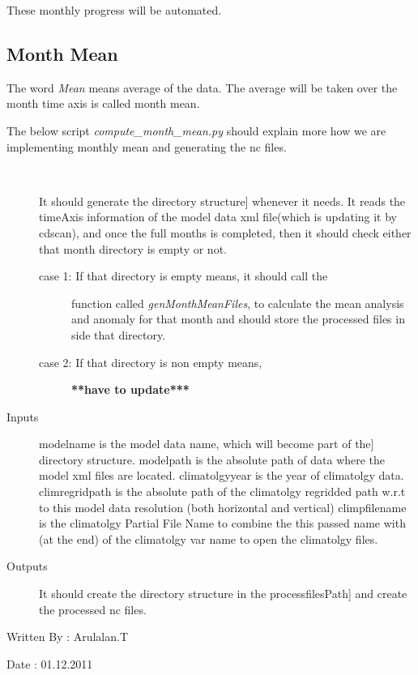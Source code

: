 \documentclass[letterpaper,10pt,english]{sphinxmanual}
\begin{document}
These monthly progress will be automated.


\subsection{Month Mean}
\label{diagnosis:month-mean}
The word \emph{Mean} means average of the data. The average will be taken over the month time axis is called month mean.

The below script \emph{compute\_month\_mean.py} should explain more how we are implementing monthly mean and generating the nc files.
\label{diagnosis:module-compute_month_mean}\label{diagnosis:module-compute_month_mean.py}

\begin{fulllineitems}
\label{diagnosis:compute_month_mean.genMonthMeanDirs}~\begin{description}
\item[{}] \leavevmode{[}It should generate the directory structure{]}
whenever it needs. It reads the timeAxis information of the
model data xml file(which is updating it by cdscan), and once
the full months is completed, then it should check either that
month directory is empty or not.
\begin{description}
\item[{case 1: If that directory is empty means, it should call the}] \leavevmode
function called \emph{genMonthMeanFiles}, to calculate
the mean analysis and anomaly for that month and should
store the processed files in side that directory.

\item[{case 2: If that directory is non empty means,}] \leavevmode
\textbf{**have to update***}

\end{description}

\item[{Inputs}] \leavevmode{[}modelname is the model data name, which will become part of the{]}
directory structure.
modelpath is the absolute path of data where the model xml files
are located.
climatolgyyear is the year of climatolgy data.
climregridpath is the absolute path of the climatolgy regridded
path w.r.t to this model data resolution (both horizontal and
vertical)
climpfilename is the climatolgy Partial File Name to combine the
this passed name with (at the end) of the climatolgy var name to
open the climatolgy files.

\item[{Outputs}] \leavevmode{[}It should create the directory structure in the processfilesPath{]}
and create the processed nc files.

\end{description}

Written By : Arulalan.T

Date : 01.12.2011

\end{fulllineitems}
\end{document}
